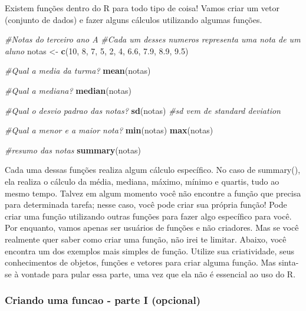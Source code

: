 \documentclass[
]{book}
\newenvironment{Shaded}{\begin{snugshade}}{\end{snugshade}}
\newcommand{\CommentTok}[1]{\textcolor[rgb]{0.56,0.35,0.01}{\textit{#1}}}
\newcommand{\DecValTok}[1]{\textcolor[rgb]{0.00,0.00,0.81}{#1}}
\newcommand{\FloatTok}[1]{\textcolor[rgb]{0.00,0.00,0.81}{#1}}
\newcommand{\FunctionTok}[1]{\textcolor[rgb]{0.13,0.29,0.53}{\textbf{#1}}}
\newcommand{\NormalTok}[1]{#1}
\newcommand{\OtherTok}[1]{\textcolor[rgb]{0.56,0.35,0.01}{#1}}
\begin{document}
Existem funções dentro do R para todo tipo de coisa! Vamos criar um vetor (conjunto de dados) e fazer alguns cálculos utilizando algumas funções.

\begin{Shaded}
\begin{Highlighting}[]
\CommentTok{\#Notas do terceiro ano A}
\CommentTok{\#Cada um desses numeros representa uma nota de um aluno}
\NormalTok{notas }\OtherTok{\textless{}{-}} \FunctionTok{c}\NormalTok{(}\DecValTok{10}\NormalTok{, }\DecValTok{8}\NormalTok{, }\DecValTok{7}\NormalTok{, }\DecValTok{5}\NormalTok{, }\DecValTok{2}\NormalTok{, }\DecValTok{4}\NormalTok{, }\FloatTok{6.6}\NormalTok{, }\FloatTok{7.9}\NormalTok{, }\FloatTok{8.9}\NormalTok{, }\FloatTok{9.5}\NormalTok{)}

\CommentTok{\#Qual a media da turma?}
\FunctionTok{mean}\NormalTok{(notas)}

\CommentTok{\#Qual a mediana?}
\FunctionTok{median}\NormalTok{(notas)}

\CommentTok{\#Qual o desvio padrao das notas?}
\FunctionTok{sd}\NormalTok{(notas) }\CommentTok{\#sd vem de standard deviation}

\CommentTok{\#Qual a menor e a maior nota?}
\FunctionTok{min}\NormalTok{(notas)}
\FunctionTok{max}\NormalTok{(notas)}

\CommentTok{\#resumo das notas}
\FunctionTok{summary}\NormalTok{(notas)}
\end{Highlighting}
\end{Shaded}

Cada uma dessas funções realiza algum cálculo específico. No caso de summary(), ela realiza o cálculo da média, mediana, máximo, mínimo e quartis, tudo ao mesmo tempo. Talvez em algum momento você não encontre a função que precisa para determinada tarefa; nesse caso, você pode criar sua própria função! Pode criar uma função utilizando outras funções para fazer algo específico para você. Por enquanto, vamos apenas ser usuários de funções e não criadores. Mas se você realmente quer saber como criar uma função, não irei te limitar. Abaixo, você encontra um dos exemplos mais simples de função. Utilize sua criatividade, seus conhecimentos de objetos, funções e vetores para criar alguma função. Mas sinta-se à vontade para pular essa parte, uma vez que ela não é essencial ao uso do R.

\hypertarget{criando-uma-funcao---parte-i-opcional}{%
\subsubsection{Criando uma funcao - parte I (opcional)}\label{criando-uma-funcao---parte-i-opcional}}
\end{document}
